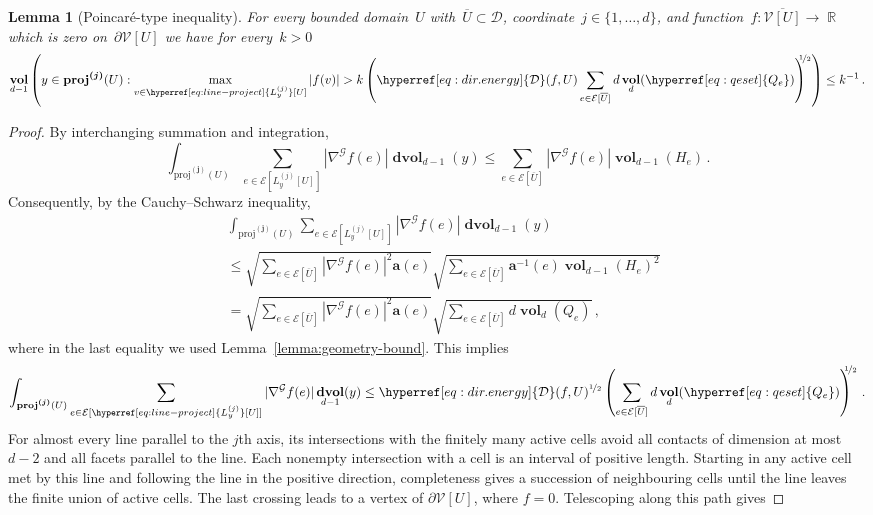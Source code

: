 \documentclass[12pt]{amsart}
\numberwithin{equation}{section}
\DeclareMathOperator{\R}{\mathbb{R}}
\newtheorem{lemma}[theorem]{Lemma}
\newcommand{\V}{\mathcal{V}}
\newcommand{\E}{\mathcal{E}}
\newcommand{\projj}{\boldsymbol{\mathrm{proj}^{(j)}}}
\newcommand{\cond}{\hyperref[eq:geometric-laplacian]{\mathbf{a}}}
\newcommand{\D}{\hyperref[eq:dir.energy]{\mathcal{D}}}
\newcommand{\Qe}{\hyperref[eq:qeset]{Q_e}}
\newcommand{\Lyj}{\hyperref[eq:line-project]{L_y^{(j)}}}
\DeclareMathOperator{\vol}{\mathbf{vol}}
\DeclareMathOperator{\dvol}{\mathbf{d vol}}
\begin{document}
\begin{lemma}[Poincar\'e-type inequality]
	\label{lemma:ptype-inequality}
	For every bounded domain~$U$ with~$\overline{U} \subset \mathcal{D}$, coordinate~$j \in \{1, \ldots, d\}$, and 
function~$f: \overline{\V[U]} \to \R$ which is zero on~$\partial \V[U]$ we have for every~$k > 0$
	\[
	\vol_{d-1}\left( y \in \projj(U): \max_{v \in \Lyj[U]} |f(v)| > k    \left( \D(f,U) \sum_{e \in \E[\overline{U}]} d   \vol_{d}(\Qe) \right)^{\! \!  \! \!\nicefrac12} \right) \leq k^{-1}  \, . 
	\]
\end{lemma}
\begin{proof}

	
	By interchanging summation and integration, 
	\[
		\int_{\projj(U)} \sum_{e \in \E[\Lyj[U]]} |\nabla^{\mathcal{G}} f(e)| \dvol_{d-1}(y)
		 \leq \sum_{e \in \E[\overline{U}]} |\nabla^{\mathcal{G}} f(e)| \vol_{d-1}(H_e)  \, . 
	\]
	Consequently, by the Cauchy–Schwarz inequality, 
	\begin{align*}
		&\int_{\projj(U)} \sum_{e \in \E[\Lyj[U]]} |\nabla^{\mathcal{G}} f(e)| \dvol_{d-1}(y) \\
		&\leq  \sqrt{\sum_{e \in \E[\overline{U}]} |\nabla^{\mathcal{G}} f(e)|^2 \cond(e)} \sqrt{ \sum_{e \in \E[\overline{U}]}    \cond^{-1}(e) \vol_{d-1}(H_e)^2	} \\
		&=  \sqrt{\sum_{e \in \E[\overline{U}]}  |\nabla^{\mathcal{G}} f(e)|^2 \cond(e)} \sqrt{ \sum_{e \in \E[\overline{U}]}   d \vol_{d}(\Qe)	} \, , 
	\end{align*}
	where in the last equality we used Lemma~\ref{lemma:geometry-bound}. This implies
	\begin{equation}
		\label{eq:bound-on-sums-of-gradients}
		\int_{\projj(U)} \sum_{e \in \E[\Lyj[U]]} |\nabla^{\mathcal{G}} f(e)| \dvol_{d-1}(y) \leq   \D(f,U)^{\nicefrac12}   \left( \sum_{e \in \E[\overline{U}]} d   \vol_{d}(\Qe)  \right)^{\! \!  \! \!\nicefrac12} \, . 
	\end{equation}
			For almost every line parallel to the $j$th axis, its intersections with the finitely many active cells avoid all contacts of dimension at most $d-2$ and all facets parallel to the line. Each nonempty intersection with a cell is an interval of positive length. Starting in any active cell met by this line and following the line in the positive direction, completeness gives a succession of neighbouring cells until the line leaves the finite union of active cells. The last crossing leads to a vertex of $\partial\V[U]$, where $f=0$. Telescoping along this path gives

\end{proof}
\end{document}
